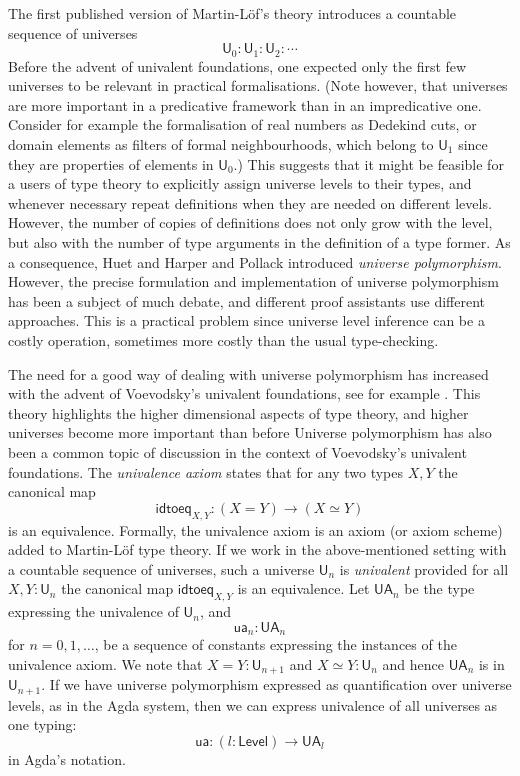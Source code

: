 \documentclass[11pt,a4paper]{article}
\def\UU{\mathsf{U}}
\def\Level{\mathsf{Level}}
\newcommand{\idtoeq}{\mathsf{idtoeq}}
\newcommand{\ua}{\mathsf{ua}}
\newcommand{\UA}{\mathsf{UA}}
\begin{document}
The first published version of Martin-Löf's theory \cite{martinlof:predicative} introduces a countable sequence of universes
$$
\UU_0 : \UU_1 : \UU_2 : \cdots
$$
Before the advent of univalent foundations, one expected only the first few universes to be relevant in practical formalisations. (Note however, that universes are more important in a predicative framework than in an impredicative one. Consider for example the formalisation of real numbers as Dedekind cuts, or domain elements as filters of formal neighbourhoods, which belong to $\UU_1$ since they are properties of elements in $\UU_0$.) This suggests that it might be feasible for a users of type theory to explicitly assign universe levels to their types, and whenever necessary repeat definitions when they are needed on different levels. However, the number of copies of definitions does not only grow with the level, but also with the number of type arguments in the definition of a type former. As a consequence, Huet \cite{Huet87} and Harper and Pollack \cite{HarperP91} introduced {\em universe polymorphism}. However, the precise formulation and implementation of universe polymorphism has been a subject of much debate, and different proof assistants use different approaches. This is a practical problem since universe level inference can be a costly operation, sometimes more costly than the usual type-checking.


The need for a good way of dealing with universe polymorphism has increased with the advent of Voevodsky's univalent foundations, see for example \cite{VV}. This theory highlights the higher dimensional aspects of type theory, and higher universes become more important than before
Universe polymorphism has also been a common topic of discussion in the context of Voevodsky's univalent foundations. The {\em univalence axiom} states that for any two types $X,Y$ the canonical map
$$
\idtoeq_{X,Y} : (X=Y)\to (X\simeq Y)
$$
is an equivalence. Formally, the univalence axiom is an axiom (or axiom scheme) added to Martin-Löf type theory. If we work in the above-mentioned setting with a countable sequence of universes, such a universe $\UU_n$ is {\em univalent} provided for all $X,Y : \UU_n$ the canonical map $\idtoeq_{X,Y}$ is an equivalence. Let $\UA_n$ be the type expressing the univalence of $\UU_n$, and
$$
\ua_n : \UA_n
$$
for $n = 0,1,\ldots$, be a sequence of constants expressing the instances of the univalence axiom. We note that $X = Y : \UU_{n+1}$ and $X\simeq Y : \UU_n$ and hence $\UA_n$ is in $\UU_{n+1}$. If we have universe polymorphism expressed as quantification over universe levels, as in the Agda system, then we can express univalence of all universes as one typing:
$$
\ua : (l : \Level) \to \UA_l
$$
in Agda's notation.
\end{document}
